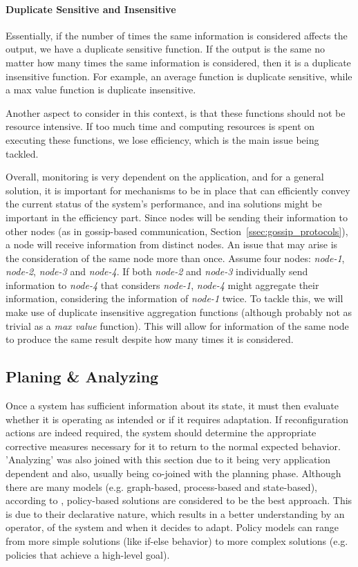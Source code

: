\paragraph{Duplicate Sensitive and Insensitive} %
Essentially, if the number of times the same information is considered affects the output, we have a duplicate sensitive function. If the output is the same no matter how many times the same information is considered, then it is a duplicate insensitive function. For example, an average function is duplicate sensitive, while a max value function is duplicate insensitive.
\par Another aspect to consider in this context, is that these functions should not be resource intensive. If too much time and computing resources is spent on executing these functions, we lose efficiency, which is the main issue being tackled.
\par Overall, monitoring is very dependent on the application, and for a general solution, it is important for mechanisms to be in place that can efficiently convey the current status of the system's performance, and \gls{ina} solutions might be important in the efficiency part. Since nodes will be sending their information to other nodes (as in gossip-based communication, Section~\ref{ssec:gossip_protocols}), a node will receive information from distinct nodes. An issue that may arise is the consideration of the same node more than once. Assume four nodes: \textit{node-1}, \textit{node-2}, \textit{node-3} and \textit{node-4}. If both \textit{node-2} and \textit{node-3} individually send information to \textit{node-4} that considers \textit{node-1}, \textit{node-4} might aggregate their information, considering the information of \textit{node-1} twice. To tackle this, we will make use of duplicate insensitive aggregation functions (although probably not as trivial as a \textit{max value} function). This will allow for information of the same node to produce the same result despite how many times it is considered.
%
%
%
\subsection{Planing \& Analyzing}
\label{ssec:decidingonadaptation}
\par Once a system has sufficient information about its state, it must then evaluate whether it is operating as intended or if it requires adaptation. If reconfiguration actions are indeed required, the system should determine the appropriate corrective measures necessary for it to return to the normal expected behavior. 'Analyzing' was also joined with this section due to it being very application dependent and also, usually being co-joined with the planning phase. %
Although there are many models (e.g. graph-based, process-based and state-based), according to \cite{Rosa2012}, policy-based solutions are considered to be the best approach. This is due to their declarative nature, which results in a better understanding by an operator, of the system and when it decides to adapt. Policy models can range from more simple solutions (like if-else behavior) to more complex solutions (e.g. policies that achieve a high-level goal).
%
%
%
